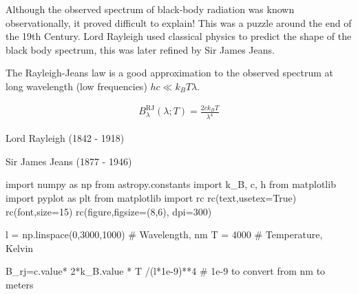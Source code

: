 \documentclass[
  letterpaper,
  DIV=11,
  numbers=noendperiod]{scrreprt}
\newenvironment{Shaded}{\begin{snugshade}}{\end{snugshade}}
\newcommand{\CommentTok}[1]{\textcolor[rgb]{0.37,0.37,0.37}{#1}}
\newcommand{\DecValTok}[1]{\textcolor[rgb]{0.68,0.00,0.00}{#1}}
\newcommand{\FloatTok}[1]{\textcolor[rgb]{0.68,0.00,0.00}{#1}}
\newcommand{\ImportTok}[1]{\textcolor[rgb]{0.00,0.46,0.62}{#1}}
\newcommand{\NormalTok}[1]{\textcolor[rgb]{0.00,0.23,0.31}{#1}}
\newcommand{\OperatorTok}[1]{\textcolor[rgb]{0.37,0.37,0.37}{#1}}
\newcommand{\StringTok}[1]{\textcolor[rgb]{0.13,0.47,0.30}{#1}}
\newcommand{\VariableTok}[1]{\textcolor[rgb]{0.07,0.07,0.07}{#1}}
\begin{document}
Although the observed spectrum of black-body radiation was known
observationally, it proved difficult to explain! This was a puzzle
around the end of the 19th Century. Lord Rayleigh used classical physics
to predict the shape of the black body spectrum, this was later refined
by Sir James Jeans.

The Rayleigh-Jeans law is a good approximation to the observed spectrum
at long wavelength (low frequencies) \(hc\ll k_BT\lambda\).

\begin{align}
B_\lambda^\mathrm{RJ}(\lambda; T) = \frac{2ck_B T}{\lambda^4}
\end{align}

Lord Rayleigh (1842 - 1918)

Sir James Jeans (1877 - 1946)

\begin{Shaded}
\begin{Highlighting}[]
\ImportTok{import}\NormalTok{ numpy }\ImportTok{as}\NormalTok{ np}
\ImportTok{from}\NormalTok{ astropy.constants }\ImportTok{import}\NormalTok{ k\_B, c, h}
\ImportTok{from}\NormalTok{ matplotlib }\ImportTok{import}\NormalTok{ pyplot }\ImportTok{as}\NormalTok{ plt}
\ImportTok{from}\NormalTok{ matplotlib }\ImportTok{import}\NormalTok{ rc}
\NormalTok{rc(}\StringTok{\textquotesingle{}text\textquotesingle{}}\NormalTok{,usetex}\OperatorTok{=}\VariableTok{True}\NormalTok{)}
\NormalTok{rc(}\StringTok{\textquotesingle{}font\textquotesingle{}}\NormalTok{,size}\OperatorTok{=}\DecValTok{15}\NormalTok{)}
\NormalTok{rc(}\StringTok{\textquotesingle{}figure\textquotesingle{}}\NormalTok{,figsize}\OperatorTok{=}\NormalTok{(}\DecValTok{8}\NormalTok{,}\DecValTok{6}\NormalTok{), dpi}\OperatorTok{=}\DecValTok{300}\NormalTok{)}

\NormalTok{l }\OperatorTok{=}\NormalTok{ np.linspace(}\DecValTok{0}\NormalTok{,}\DecValTok{3000}\NormalTok{,}\DecValTok{1000}\NormalTok{) }\CommentTok{\# Wavelength, nm}
\NormalTok{T }\OperatorTok{=} \DecValTok{4000} \CommentTok{\# Temperature, Kelvin}

\NormalTok{B\_rj}\OperatorTok{=}\NormalTok{c.value}\OperatorTok{*} \DecValTok{2}\OperatorTok{*}\NormalTok{k\_B.value }\OperatorTok{*}\NormalTok{ T }\OperatorTok{/}\NormalTok{(l}\OperatorTok{*}\FloatTok{1e{-}9}\NormalTok{)}\OperatorTok{**}\DecValTok{4} \CommentTok{\# 1e{-}9 to convert from nm to meters}
\end{Highlighting}
\end{Shaded}
\end{document}
